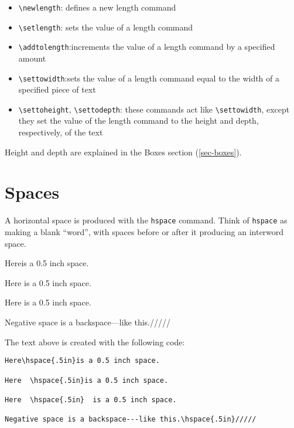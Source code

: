 \documentclass{article}
\begin{document}
\begin{itemize}
   \item \verb-\newlength-: defines a new length command
   \item \verb-\setlength-: sets the value of a length command
   \item \verb-\addtolength-:increments the value of a length command by a specified amount
   \item \verb-\settowidth-:sets the value of a length command equal to the width of a specified
    piece of text
   \item \verb:\settoheight:, \verb-\settodepth-: these commands act like \verb:\settowidth:, except
    they set the value of the length command to the height and depth, respectively, of the text
\end{itemize}
 
Height and depth are explained in the Boxes section (\ref{sec-boxes}).


\section{Spaces}\label{sec-spaces}

A horizontal space is produced with the \verb:hspace: command. Think of \verb:hspace: as
making a blank ``word'', with spaces before or after it producing an interword space.

Here\hspace{.5in}is a 0.5 inch space.

Here  \hspace{.5in}is a 0.5 inch space.

Here  \hspace{.5in}  is a 0.5 inch space.

Negative space is a backspace---like this.\hspace{.5in}///// 

\bigskip

\noindent The text above is created with the following code: 

\begin{lstlisting}[language={[LaTeX]TeX}]
Here\hspace{.5in}is a 0.5 inch space.

Here  \hspace{.5in}is a 0.5 inch space.

Here  \hspace{.5in}  is a 0.5 inch space.

Negative space is a backspace---like this.\hspace{.5in}/////
\end{lstlisting}
\end{document}
